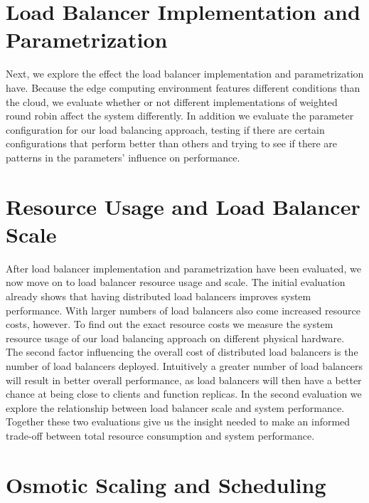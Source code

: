 

\section{Load Balancer Implementation and Parametrization}
Next, we explore the effect the load balancer implementation and parametrization have.
Because the edge computing environment features different conditions than the cloud, we evaluate whether or not different implementations of weighted round robin affect the system differently.
In addition we evaluate the parameter configuration for our load balancing approach, testing if there are certain configurations that perform better than others and trying to see if there are patterns in the parameters' influence on performance.



\section{Resource Usage and Load Balancer Scale}
After load balancer implementation and parametrization have been evaluated, we now move on to load balancer resource usage and scale.
The initial evaluation already shows that having distributed load balancers improves system performance.
With larger numbers of load balancers also come increased resource costs, however.
To find out the exact resource costs we measure the system resource usage of our load balancing approach on different physical hardware.
The second factor influencing the overall cost of distributed load balancers is the number of load balancers deployed.
Intuitively a greater number of load balancers will result in better overall performance, as load balancers will then have a better chance at being close to clients and function replicas.
In the second evaluation we explore the relationship between load balancer scale and system performance.
Together these two evaluations give us the insight needed to make an informed trade-off between total resource consumption and system performance.




\section{Osmotic Scaling and Scheduling}

